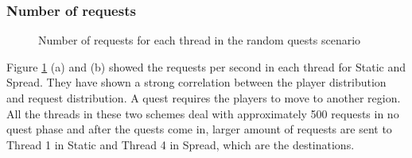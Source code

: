 \documentclass[12pt,a4paper]{article} %
\theoremstyle{definition}
\theoremstyle{remark}
\begin{document}
\subsubsection {Number of requests} 
	\begin{figure}[!ht]
		\hfill
		\caption{Number of requests for each thread in the random quests scenario}
		\label{Request_random}
	\end{figure}
Figure \ref{Request_random} (a) and (b) showed the requests per second in each thread for Static and Spread. 
They have shown a strong correlation between the player distribution and request distribution. 
A quest requires the players to move to another region. All the threads in these two schemes deal with approximately 500 requests in no quest phase and after the quests come in, larger amount of requests are sent to Thread 1 in Static and Thread 4 in Spread, which are the destinations.
\end{document}
